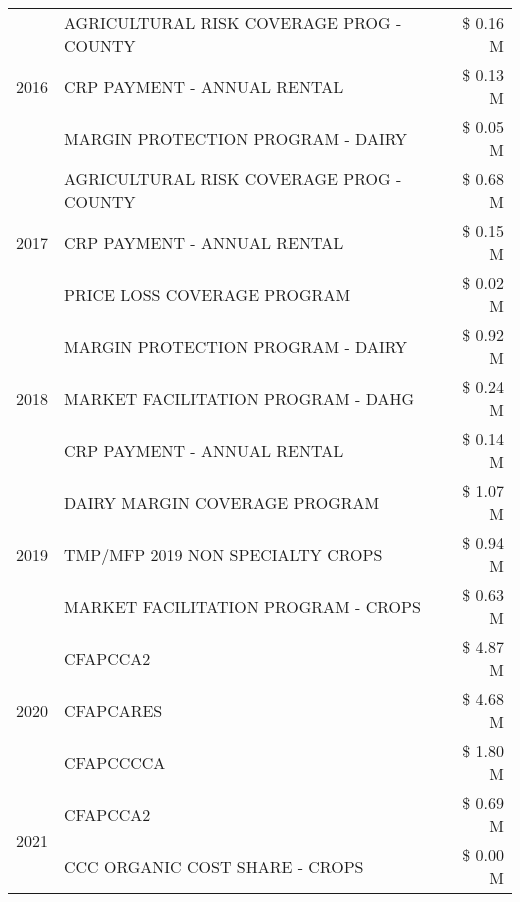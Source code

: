 \begin{tabular}{llr}
\cline{1-3}
\multirow[t]{3}{*}{2016} & AGRICULTURAL RISK COVERAGE PROG - COUNTY & \$ 0.16 M \\
 & CRP PAYMENT - ANNUAL RENTAL & \$ 0.13 M \\
 & MARGIN PROTECTION PROGRAM - DAIRY & \$ 0.05 M \\
\cline{1-3}
\multirow[t]{3}{*}{2017} & AGRICULTURAL RISK COVERAGE PROG - COUNTY & \$ 0.68 M \\
 & CRP PAYMENT - ANNUAL RENTAL & \$ 0.15 M \\
 & PRICE LOSS COVERAGE PROGRAM & \$ 0.02 M \\
\cline{1-3}
\multirow[t]{3}{*}{2018} & MARGIN PROTECTION PROGRAM - DAIRY & \$ 0.92 M \\
 & MARKET FACILITATION PROGRAM - DAHG & \$ 0.24 M \\
 & CRP PAYMENT - ANNUAL RENTAL & \$ 0.14 M \\
\cline{1-3}
\multirow[t]{3}{*}{2019} & DAIRY MARGIN COVERAGE PROGRAM & \$ 1.07 M \\
 & TMP/MFP 2019 NON SPECIALTY CROPS & \$ 0.94 M \\
 & MARKET FACILITATION PROGRAM - CROPS & \$ 0.63 M \\
\cline{1-3}
\multirow[t]{3}{*}{2020} & CFAPCCA2 & \$ 4.87 M \\
 & CFAPCARES & \$ 4.68 M \\
 & CFAPCCCCA & \$ 1.80 M \\
\cline{1-3}
\multirow[t]{2}{*}{2021} & CFAPCCA2 & \$ 0.69 M \\
 & CCC ORGANIC COST SHARE - CROPS & \$ 0.00 M \\
\cline{1-3}
\bottomrule
\end{tabular}
